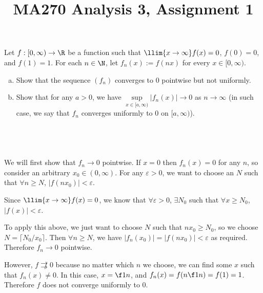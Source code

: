 \documentclass[a4paper]{article}
\title{MA270 Analysis 3, Assignment 1}
\begin{document}
\maketitle

\setlength{\parindent}{0em}
\setlength{\parskip}{1em}


\begin{questionbody}
Let $f : [0, \infty) \to \R$ be a function such that $\llim{x \to \infty} f(x) = 0$, $f(0) = 0$, and $f(1) = 1$. For each $n \in \N$, let $f_n(x) := f(nx)$ for every $x \in [0, \infty)$. %
%
\begin{enumerate}[(a)]
    \item Show that the sequence $(f_n)$ converges to 0 pointwise but not uniformly.
    \item Show that for any $a > 0$, we have $\sup\limits_{x \in [a, \infty)} |f_n(x)| \to 0$ as $n \to \infty$ (in such case, we say that $f_n$ converges uniformly to 0 on $[a, \infty)$). %
\end{enumerate}
\end{questionbody}

\subsection{~} %

We will first show that $f_n \to 0$ pointwise. If $x = 0$ then $f_n(x) = 0$ for any $n$, so consider an arbitrary $x_0 \in (0, \infty)$. For any $\varepsilon > 0$, we want to choose an $N$ such that $\forall n \ge N$, $|f(n x_0)| < \varepsilon$.

Since $\llim{x \to \infty} f(x) = 0$, we know that $\forall \varepsilon > 0$, $\exists N_0$ such that $\forall x \ge N_0$, $|f(x)| < \varepsilon$.

To apply this above, we just want to choose $N$ such that $n x_0 \ge N_0$, so we choose $N = \lceil N_0 / x_0 \rceil$. Then $\forall n \ge N$, we have $|f_n(x_0)| = |f(n x_0)| < \varepsilon$ as required. Therefore $f_n \to 0$ pointwise.

However, $f \not\rightrightarrows 0$ because no matter which $n$ we choose, we can find some $x$ such that $f_n(x) \ne 0$. In this case, $x = \f1n$, and $f_n(x) = f(n \f1n) = f(1) = 1$. Therefore $f$ does not converge uniformly to 0.

\subsection{~} %
\end{document}

